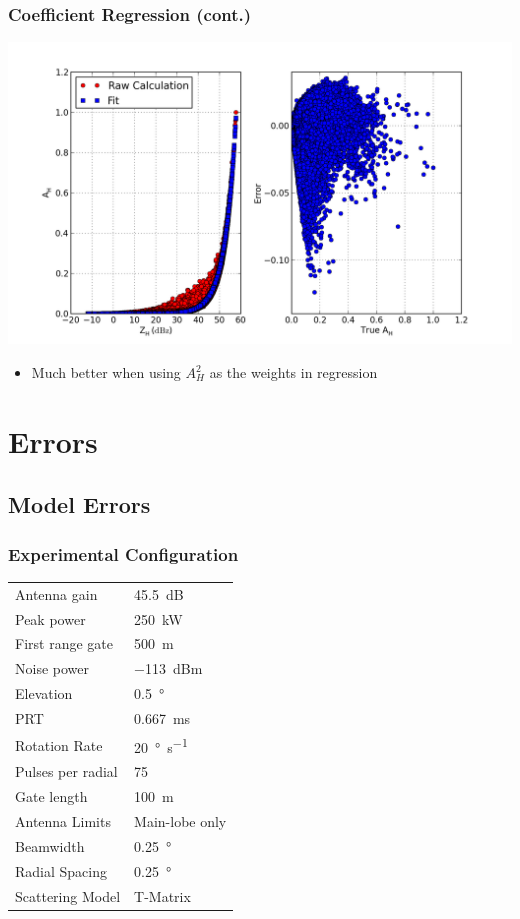 \documentclass[red]{beamer}
\begin{document}
\begin{frame}
	\frametitle{Coefficient Regression (cont.)}
	\begin{center}
		\includegraphics[scale=0.35]{figures/weighted_power_law.png}
	\end{center}
	\begin{itemize}
		\item Much better when using $A_H^2$ as the weights in regression
	\end{itemize}
\end{frame}

\section{Errors}
\subsection{Model Errors}
\begin{frame}
	\frametitle{Experimental Configuration}
	\begin{center}
	    \begin{tabular}{ | l | l | }
	        \hline
	        Antenna gain & \SI{45.5}{dB} \\
	        Peak power & \SI{250}{\kilo\watt} \\
	        First range gate & \SI{500}{\meter} \\
	        Noise power & \SI{-113}{dBm} \\
	        Elevation & \SI{0.5}{\degree} \\
	        PRT & \SI{0.667}{\milli\second} \\
	        Rotation Rate & \SI{20}{\degree\per\second} \\
	        Pulses per radial & \num{75} \\
	        Gate length & \SI{100}{\meter} \\
	        Antenna Limits & Main-lobe only \\
			Beamwidth & \SI{0.25}{\degree} \\
			Radial Spacing & \SI{0.25}{\degree} \\
			Scattering Model & T-Matrix \\
			\hline
	    \end{tabular}
	\end{center}
\end{frame}
\end{document}
